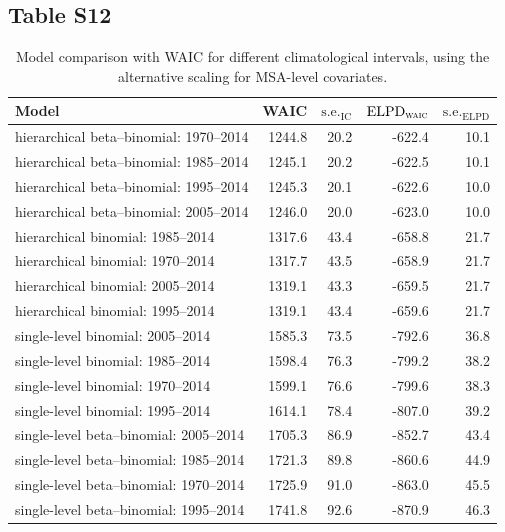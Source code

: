 \documentclass[draft]{agujournal}\usepackage{knitr}
\begin{document}
\subsection*{Table S12}
\begin{table}[H]
\centering
\begingroup\small
\begin{tabular}{p{3in}rrrr}
  \hline
Model & WAIC & $\text{s.e.}_{\text{IC}}$ & $\text{ELPD}_{\text{\scshape{waic}}}$ & $\text{s.e.}_{\text{ELPD}}$ \\ 
  \hline
hierarchical beta--binomial: 1970--2014 & 1244.8 & 20.2 & -622.4 & 10.1 \\ 
  hierarchical beta--binomial: 1985--2014 & 1245.1 & 20.2 & -622.5 & 10.1 \\ 
  hierarchical beta--binomial: 1995--2014 & 1245.3 & 20.1 & -622.6 & 10.0 \\ 
  hierarchical beta--binomial: 2005--2014 & 1246.0 & 20.0 & -623.0 & 10.0 \\ 
  hierarchical binomial: 1985--2014 & 1317.6 & 43.4 & -658.8 & 21.7 \\ 
  hierarchical binomial: 1970--2014 & 1317.7 & 43.5 & -658.9 & 21.7 \\ 
  hierarchical binomial: 2005--2014 & 1319.1 & 43.3 & -659.5 & 21.7 \\ 
  hierarchical binomial: 1995--2014 & 1319.1 & 43.4 & -659.6 & 21.7 \\ 
  single-level binomial: 2005--2014 & 1585.3 & 73.5 & -792.6 & 36.8 \\ 
  single-level binomial: 1985--2014 & 1598.4 & 76.3 & -799.2 & 38.2 \\ 
  single-level binomial: 1970--2014 & 1599.1 & 76.6 & -799.6 & 38.3 \\ 
  single-level binomial: 1995--2014 & 1614.1 & 78.4 & -807.0 & 39.2 \\ 
  single-level beta--binomial: 2005--2014 & 1705.3 & 86.9 & -852.7 & 43.4 \\ 
  single-level beta--binomial: 1985--2014 & 1721.3 & 89.8 & -860.6 & 44.9 \\ 
  single-level beta--binomial: 1970--2014 & 1725.9 & 91.0 & -863.0 & 45.5 \\ 
  single-level beta--binomial: 1995--2014 & 1741.8 & 92.6 & -870.9 & 46.3 \\ 
   \hline
\end{tabular}
\endgroup
\caption[Model comparison: WAIC (climatological interval using absolute MSA-level values).]{Model comparison with WAIC for different climatological intervals, using the alternative scaling for MSA-level covariates.} 
\label{tab:waic.years}
\end{table}
\end{document}
